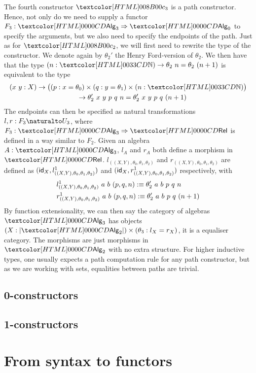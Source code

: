 The fourth constructor $\Bciii$ is a path constructor. Hence, not only
do we need to supply a functor $F_3 : \Func{\Alg_3}{\Alg_0}$ to
specify the arguments, but we also need to specify the endpoints of
the path. Just as for $\Bcii$, we will first need to rewrite the type
of the constructor. We denote again by $\theta_2'$ the Henry
Ford-version of $\theta_2$.  We then have that the type
$(n : \natty) \to \theta_2\ n = \theta_2\ (n+ 1)$ is equivalent to the
type
%
\begin{multline*}
(x\ y : X) \to \big((p : x =  \theta_0) \times (q : y = \theta_1) \times (n : \natty)\big) \\
\ \ \ \ \to \theta_2'\ x\ y\ p\ q\ n = \theta_2'\ x\ y\ p\ q\ (n+1)
\end{multline*}
%
The endpoints can then be specified as natural transformations
$l, r : \Nat{F_3}{U_3}$, where $F_3 : \Func{\Alg_3}{\Rel}$ is defined in a
way similar to $F_2$. Given an algebra $A : \Alg_3$, $l_A$ and $r_A$
both define a morphism in
$\Rel$. $l_{((X,Y),\theta_0,\theta_1,\theta_2)}$ and
$r_{((X,Y),\theta_0,\theta_1,\theta_2)}$ are defined as
$(\mathsf{id}_X, l^1_{((X,Y),\theta_0,\theta_1,\theta_2)})$ and
$(\mathsf{id}_X,r^1_{((X,Y),\theta_0,\theta_1,\theta_2)})$ respectively, with
%
\begin{align*}
&l^1_{((X,Y),\theta_0,\theta_1,\theta_2)}\ a\ b\ (p, q, n) :\equiv \theta_2'\ a\ b\ p\ q\ n \\
&r^1_{((X,Y),\theta_0,\theta_1,\theta_2)}\ a\ b\ (p, q, n) :\equiv \theta_2'\ a\ b\ p\ q\ (n+1)
\end{align*}
%
By function extensionality, we can then say the category of algebras
$\Alg_3$ has objects $(X : | \Alg_2 |) \times (\theta_3 : l_X = r_X)$,
\ie it is a equaliser category. The morphisms are just morphisms in
$\Alg_2$ with no extra structure. For higher inductive types, one
usually expects a path computation rule for any path constructor, but
as we are working with sets, equalities between paths are trivial.

\subsection{0-constructors}

\subsection{1-constructors}


\section{From syntax to functors}

